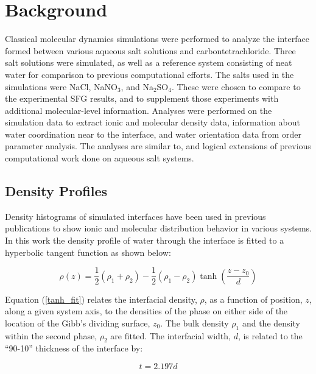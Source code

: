 \section{Background}

Classical molecular dynamics simulations were performed to analyze the interface formed between various aqueous salt solutions and carbontetrachloride. Three salt solutions were simulated, as well as a reference system consisting of neat water for comparison to previous computational efforts.\cite{Hore2007,Hore2008,Hore2007a,Walker2006b,Walker2007a,Walker2007b} The salts used in the simulations were NaCl, NaNO$_3$, and Na$_2$SO$_4$. These were chosen to compare to the experimental SFG results, and to supplement those experiments with additional molecular-level information. Analyses were performed on the simulation data to extract ionic and molecular density data, information about water coordination near to the interface, and water orientation data from order parameter analysis. The analyses are similar to, and logical extensions of previous computational work done on aqueous salt systems.

\subsection{Density Profiles}
Density histograms of simulated interfaces have been used in previous publications to show ionic and molecular distribution behavior in various systems.\cite{Chang1995,Eggimann2008,Du2008,Wick2006c,Petersen2005a,Hore2008,Walker2006b,Walker2007b} In this work the density profile of water through the interface is fitted to a hyperbolic tangent function\cite{Wick2006c,MATSUMOTO1988} as shown below:

\begin{equation}\label{tanh_fit}
	\rho(z) = \frac12(\rho_1+\rho_2) - \frac12\left(\rho_1-\rho_2\right)\tanh\left(\frac{z-z_0}{d}\right)
\end{equation}

Equation (\ref{tanh_fit}) relates the interfacial density, $\rho$, as a function of position, $z$, along a given system axis, to the densities of the phase on either side of the location of the Gibb's dividing surface, $z_0$. The bulk density $\rho_1$ and the density within the second phase, $\rho_2$ are fitted.  The interfacial width, $d$, is related to the ``90-10'' thickness of the interface by:

\begin{equation}\label{90-10}
	t = 2.197d
\end{equation}

